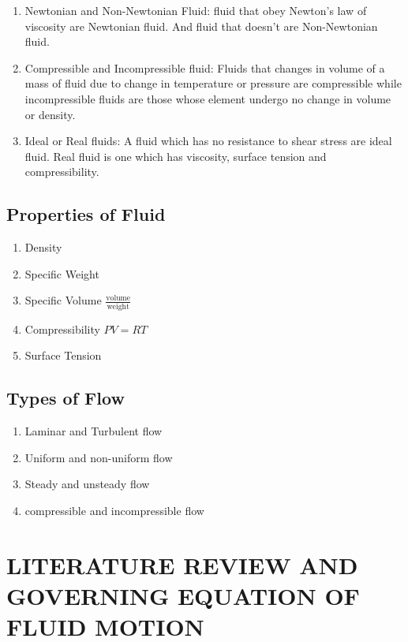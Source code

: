 \documentclass[12pt]{report}
\newcommand{\dsp}{\displaystyle}
\begin{document}
	\begin{enumerate}
		\item Newtonian and Non-Newtonian Fluid: fluid that obey Newton's law of viscosity are Newtonian fluid. And fluid that doesn't are Non-Newtonian fluid.
		
		\item Compressible and Incompressible fluid: Fluids that changes in volume of a mass of fluid due to change in temperature or pressure are compressible while incompressible fluids are those whose element undergo no change in volume or density.
		
		\item Ideal or Real fluids: A fluid which has no resistance to shear stress are ideal fluid. Real fluid is one which has viscosity, surface tension and compressibility.
	\end{enumerate}

	\section{Properties of Fluid}
	\begin{enumerate}
		\item Density
		\item Specific Weight
		\item Specific Volume $\dsp \frac{\mathrm{volume}}{\mathrm{weight}}$
		\item Compressibility $PV = RT$
		\item Surface Tension
	\end{enumerate}

	\section{Types of Flow}
	\begin{enumerate}
		\item Laminar and Turbulent flow
		\item Uniform and non-uniform flow
		\item Steady and unsteady flow
		\item compressible and incompressible flow
	\end{enumerate}
	
	
	\chapter{LITERATURE REVIEW AND GOVERNING EQUATION OF FLUID MOTION}
\end{document}
